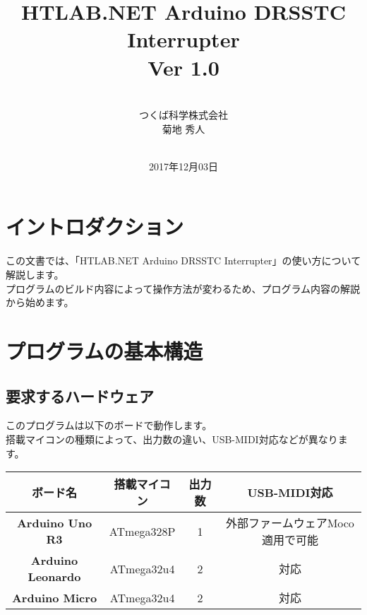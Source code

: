 \documentclass[a4paper,11pt]{jsarticle}
\newcommand{\showVer}{Ver 1.0}
\begin{document}
\begin{titlepage}
\title{HTLAB.NET Arduino DRSSTC Interrupter \\\showVer}
\author{\vspace*{80mm}\ \\つくば科学株式会社\\菊地 秀人}
\date{\vspace*{20mm}\ \\2017年12月03日}
\maketitle
\thispagestyle{empty}
\end{titlepage}
\clearpage

\section{イントロダクション}
この文書では、「HTLAB.NET Arduino DRSSTC Interrupter」の使い方について解説します。\\
プログラムのビルド内容によって操作方法が変わるため、プログラム内容の解説から始めます。




\section{プログラムの基本構造}
\subsection{要求するハードウェア}
このプログラムは以下のボードで動作します。\\
搭載マイコンの種類によって、出力数の違い、USB-MIDI対応などが異なります。

\begin{table}[htbp]
\begin{center}
\begin{tabular}{ | c | c | c | c | }
\hline
\textbf{ボード名} & \textbf{搭載マイコン} & \textbf{出力数} & \textbf{USB-MIDI対応} \\\hline
\textbf{Arduino Uno R3} & ATmega328P & 1 & 外部ファームウェアMoco適用で可能\\\hline
\textbf{Arduino Leonardo} & ATmega32u4 & 2 & 対応 \\\hline
\textbf{Arduino Micro} & ATmega32u4 & 2 & 対応 \\\hline
\end{tabular}
\end{center}
\end{table}
\end{document}
